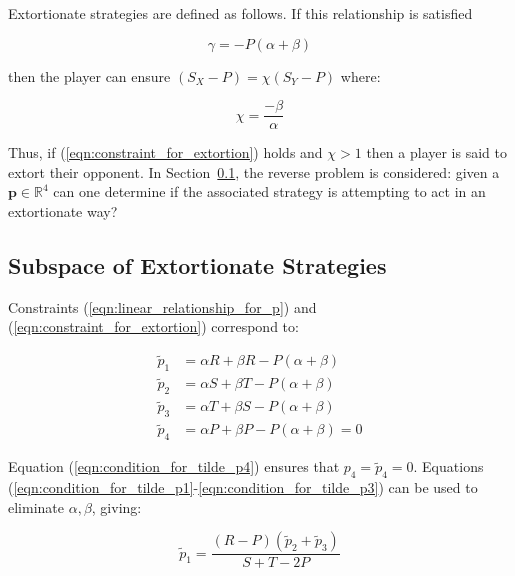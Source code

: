\documentclass[a4paper]{article}
\begin{document}
Extortionate strategies are defined as follows. If this relationship is
satisfied

\begin{equation}\label{eqn:constraint_for_extortion}
    \gamma = - P(\alpha + \beta)
\end{equation}

then the player can ensure \((S_X - P)=\chi(S_Y-P)\) where:

\begin{equation}\label{eqn:definition_of_chi}
    \chi=\frac{-\beta}{\alpha}
\end{equation}

\noindent Thus, if (\ref{eqn:constraint_for_extortion}) holds and \(\chi >1\) then a player is
said to extort their opponent.
In Section~\ref{sec:subspace_of_extortionate_strategies}, the reverse problem is considered: given a
\(\textbf{p}\in\mathbb{R}^4\) can one determine if the associated strategy is attempting
to act in an extortionate way?

\subsection{Subspace of Extortionate Strategies}\label{sec:subspace_of_extortionate_strategies}

Constraints (\ref{eqn:linear_relationship_for_p}) and
(\ref{eqn:constraint_for_extortion}) correspond to:

\begin{align}
    \tilde p_1 & = \alpha R + \beta R - P (\alpha + \beta)
            \label{eqn:condition_for_tilde_p1}\\
    \tilde p_2 & = \alpha S + \beta T - P (\alpha + \beta)
            \label{eqn:condition_for_tilde_p2}\\
    \tilde p_3 & = \alpha T + \beta S - P (\alpha + \beta)
            \label{eqn:condition_for_tilde_p3}\\
    \tilde p_4 & = \alpha P + \beta P - P (\alpha + \beta) = 0
            \label{eqn:condition_for_tilde_p4}
\end{align}

Equation (\ref{eqn:condition_for_tilde_p4}) ensures that \(p_4=\tilde p_4=0\).
Equations (\ref{eqn:condition_for_tilde_p1}-\ref{eqn:condition_for_tilde_p3})
can be used to eliminate \(\alpha, \beta\), giving:

\begin{equation}\label{eqn:planar_definition_of_extortion}
    \tilde p_1 = \frac{(R - P)(\tilde p_2 + \tilde p_3)}{S + T - 2P}
\end{equation}
\end{document}
